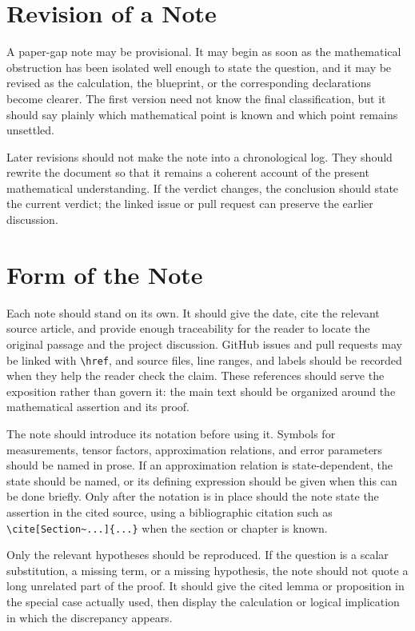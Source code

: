 \documentclass[11pt]{article}
\begin{document}
\section{Revision of a Note}

A paper-gap note may be provisional.  It may begin as soon as the mathematical
obstruction has been isolated well enough to state the question, and it may be
revised as the calculation, the blueprint, or the corresponding \Lean{}
declarations become clearer.  The first version need not know the final
classification, but it should say plainly which mathematical point is known and
which point remains unsettled.

Later revisions should not make the note into a chronological log.  They should
rewrite the document so that it remains a coherent account of the present
mathematical understanding.  If the verdict changes, the conclusion should state
the current verdict; the linked issue or pull request can preserve the earlier
discussion.

\section{Form of the Note}

Each note should stand on its own.  It should give the date, cite the relevant
source article, and provide enough traceability for the reader to locate the
original passage and the project discussion.  GitHub issues and pull requests may
be linked with \verb|\href|, and source files, line ranges, and labels should be
recorded when they help the reader check the claim.  These references should
serve the exposition rather than govern it: the main text should be organized
around the mathematical assertion and its proof.

The note should introduce its notation before using it.  Symbols for
measurements, tensor factors, approximation relations, and error parameters
should be named in prose.  If an approximation relation is state-dependent, the
state should be named, or its defining expression should be given when this can
be done briefly.  Only after the notation is in place should the note state the
assertion in the cited source, using a bibliographic citation such as
\verb|\cite[Section~...]{...}| when the section or chapter is known.

Only the relevant hypotheses should be reproduced.  If the question is a scalar
substitution, a missing term, or a missing hypothesis, the note should not quote
a long unrelated part of the proof.  It should give the cited lemma or
proposition in the special case actually used, then display the calculation or
logical implication in which the discrepancy appears.
\end{document}
